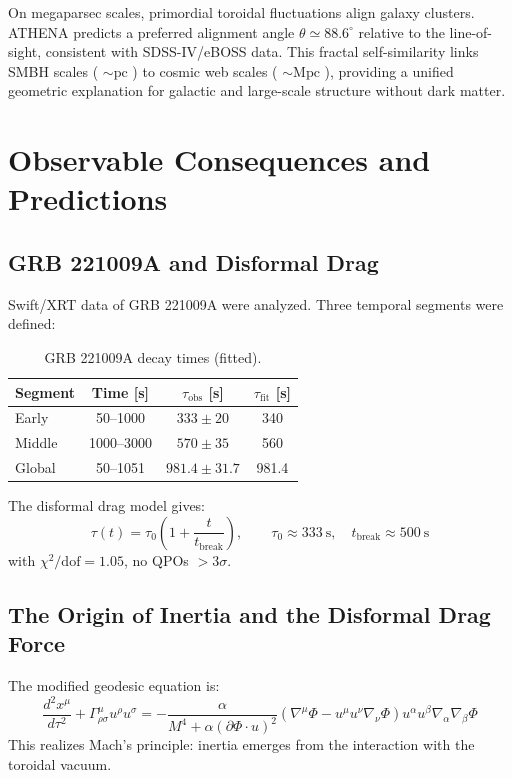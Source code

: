 \documentclass[11pt,a4paper]{article}
\begin{document}
On megaparsec scales, primordial toroidal fluctuations align galaxy clusters. ATHENA predicts a preferred alignment angle \(\theta \simeq 88.6^{\circ}\) relative to the line-of-sight, consistent with SDSS-IV/eBOSS data. This fractal self-similarity links SMBH scales ( \(\sim \mathrm{pc}\) ) to cosmic web scales ( \(\sim \mathrm{Mpc}\) ), providing a unified geometric explanation for galactic and large-scale structure without dark matter.

\section{Observable Consequences and Predictions}

\subsection{GRB 221009A and Disformal Drag}
Swift/XRT data of GRB 221009A were analyzed. Three temporal segments were defined:

\begin{table}[H]
\centering
\caption{GRB 221009A decay times (fitted).}
\begin{tabular}{lccc}
\toprule
Segment & Time [s] & \(\tau_{\text{obs}}\) [s] & \(\tau_{\text{fit}}\) [s] \\
\midrule
Early & 50–1000 & \(333 \pm 20\) & 340 \\
Middle & 1000–3000 & \(570 \pm 35\) & 560 \\
Global & 50–1051 & \(981.4 \pm 31.7\) & 981.4 \\
\bottomrule
\end{tabular}
\end{table}

The disformal drag model gives:
\begin{equation}
\tau (t) = \tau_{0}\left(1 + \frac{t}{t_{\mathrm{break}}}\right),\qquad \tau_{0}\approx 333\mathrm{~s},\quad t_{\mathrm{break}}\approx 500\mathrm{~s} \tag{33}
\end{equation}
with \(\chi^{2} / \mathrm{dof} = 1.05\), no QPOs \(>3\sigma\).

\subsection{The Origin of Inertia and the Disformal Drag Force}
The modified geodesic equation is:
\begin{equation}
\frac{d^2x^{\mu}}{d\tau^2} +\Gamma_{\rho \sigma}^{\mu}u^{\rho}u^{\sigma} = -\frac{\alpha}{M^4 + \alpha(\partial\Phi\cdot u)^2} (\nabla^{\mu}\Phi -u^{\mu}u^{\nu}\nabla_{\nu}\Phi)u^{\alpha}u^{\beta}\nabla_{\alpha}\nabla_{\beta}\Phi \tag{34}
\end{equation}
This realizes Mach's principle: inertia emerges from the interaction with the toroidal vacuum.
\end{document}
